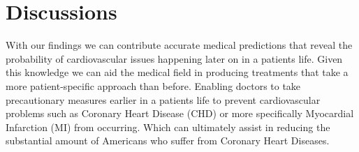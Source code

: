 \section{Discussions}
With our findings we can contribute accurate medical predictions that reveal the probability of cardiovascular issues happening later on in a patients life.  Given this knowledge we can aid the medical field in producing treatments that take a more patient-specific approach than before.  Enabling doctors to take precautionary measures earlier in a patients life to prevent cardiovascular problems such as Coronary Heart Disease (CHD) or more specifically Myocardial Infarction (MI) from occurring. Which can ultimately assist in reducing the substantial amount of Americans who suffer from Coronary Heart Diseases. 